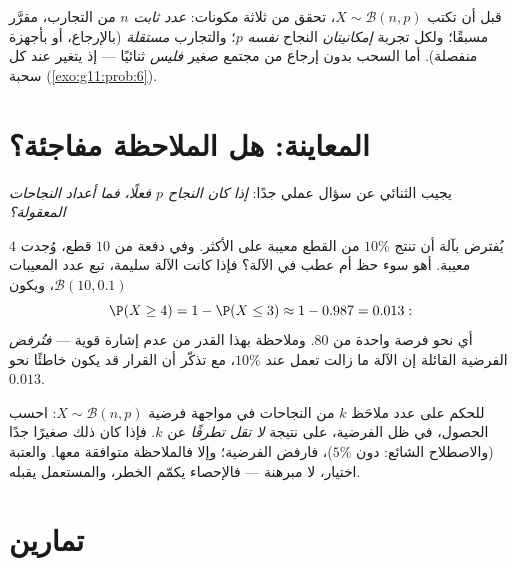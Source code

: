 \begin{method}\label{met:g11:binom:recognize}
قبل أن تكتب $X \sim \mathcal B(n, p)$، تحقق من ثلاثة مكونات:
\emph{عدد ثابت} $n$ من التجارب، مقرَّر مسبقًا؛ ولكل تجربة
\emph{إمكانيتان}  النجاح \emph{نفسه} $p$؛ والتجارب
\emph{مستقلة} (بالإرجاع، أو بأجهزة منفصلة).
أما السحب بدون إرجاع من مجتمع صغير \emph{فليس}
ثنائيًا --- إذ يتغير  عند كل سحبة
(\cref{exo:g11:prob:6}).
\end{method}

\section{المعاينة: هل الملاحظة مفاجئة؟}

يجيب  الثنائي عن سؤال عملي جدًا: \emph{إذا كان 
النجاح $p$ فعلًا، فما أعداد النجاحات
المعقولة؟}

\begin{example}\label{ex:g11:binom:decision}
يُفترض بآلة أن تنتج $10\%$ من القطع معيبة على الأكثر. وفي
دفعة من $10$ قطع، وُجدت $4$ معيبة. أهو سوء حظ أم عطب في الآلة؟ فإذا
كانت الآلة سليمة، تبع عدد المعيبات
$\mathcal B(10, 0.1)$، ويكون
\[
\P(X \geq 4) = 1 - \P(X \leq 3) \approx 1 - 0.987 = 0.013 :
\]
أي نحو فرصة واحدة من $80$. وملاحظة  بهذا القدر من عدم 
إشارة قوية --- \emph{فتُرفض} الفرضية القائلة إن الآلة ما زالت تعمل
عند $10\%$، مع تذكّر أن القرار قد يكون خاطئًا 
نحو $0.013$.
\end{example}

\begin{method}\label{met:g11:binom:decision}
للحكم على عدد ملاحَظ $k$ من النجاحات في مواجهة فرضية
$X \sim \mathcal B(n, p)$: احسب  الحصول، في ظل الفرضية،
على نتيجة \emph{لا تقل تطرفًا} عن $k$. فإذا كان ذلك 
صغيرًا جدًا (والاصطلاح الشائع: دون $5\%$)، فارفض الفرضية؛
وإلا فالملاحظة متوافقة معها. والعتبة اختيار،
لا مبرهنة --- فالإحصاء يكمّم الخطر، والمستعمل
يقبله.
\end{method}

\section{تمارين}

